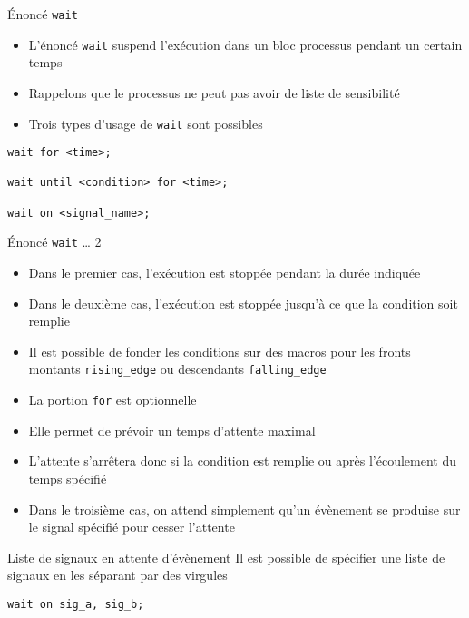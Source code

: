 \documentclass[presentation]{beamer}
\begin{document}
\begin{frame}[label={sec:orgf0f3741},fragile]{Énoncé \texttt{wait}}
 \begin{itemize}
\item L'énoncé \texttt{wait} suspend l'exécution dans un bloc processus pendant un certain temps
\item Rappelons que le processus ne peut pas avoir de liste de sensibilité
\item Trois types d'usage de \texttt{wait} sont possibles
\end{itemize}

\begin{verbatim}
wait for <time>; 

wait until <condition> for <time>;

wait on <signal_name>;
\end{verbatim}
\end{frame}

\begin{frame}[label={sec:org3b82de2},fragile]{Énoncé \texttt{wait} \ldots{} 2}
 \begin{itemize}
\item Dans le premier cas, l'exécution est stoppée pendant la durée indiquée
\item Dans le deuxième cas, l'exécution est stoppée jusqu'à ce que la condition soit remplie
\item Il est possible de fonder les conditions sur des macros pour les fronts montants \texttt{rising\_edge} ou descendants \texttt{falling\_edge}
\item La portion \texttt{for} est optionnelle
\item Elle permet de prévoir un temps d'attente maximal
\item L'attente s'arrêtera donc si la condition est remplie ou après l'écoulement du temps spécifié
\item Dans le troisième cas, on attend simplement qu'un évènement se produise sur le signal spécifié pour cesser l'attente
\end{itemize}
\end{frame}

\begin{frame}[label={sec:orge2f96d5},fragile]{Liste de signaux en attente d'évènement}
 Il est possible de spécifier une liste de signaux en les séparant par des virgules

\begin{verbatim}
wait on sig_a, sig_b;
\end{verbatim}
\end{frame}
\end{document}
